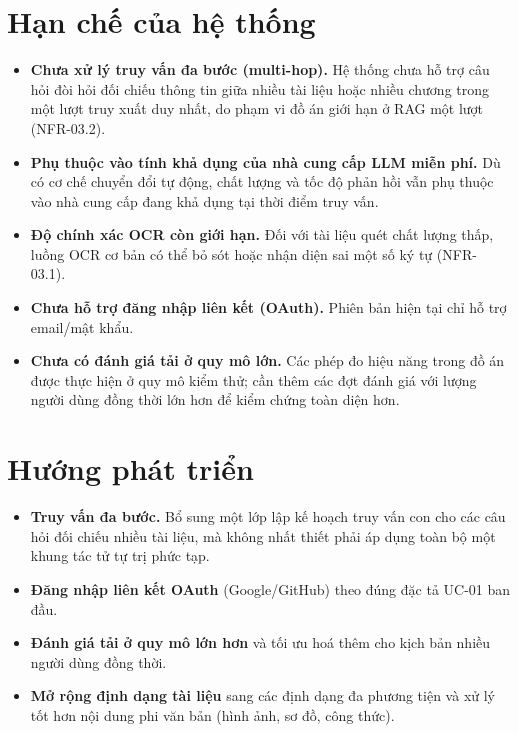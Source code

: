\section{Hạn chế của hệ thống}
\begin{itemize}
    \item \textbf{Chưa xử lý truy vấn đa bước (multi-hop).} Hệ thống chưa hỗ trợ câu hỏi đòi hỏi đối chiếu thông tin giữa nhiều tài liệu hoặc nhiều chương trong một lượt truy xuất duy nhất, do phạm vi đồ án giới hạn ở RAG một lượt (NFR-03.2).
    \item \textbf{Phụ thuộc vào tính khả dụng của nhà cung cấp LLM miễn phí.} Dù có cơ chế chuyển đổi tự động, chất lượng và tốc độ phản hồi vẫn phụ thuộc vào nhà cung cấp đang khả dụng tại thời điểm truy vấn.
    \item \textbf{Độ chính xác OCR còn giới hạn.} Đối với tài liệu quét chất lượng thấp, luồng OCR cơ bản có thể bỏ sót hoặc nhận diện sai một số ký tự (NFR-03.1).
    \item \textbf{Chưa hỗ trợ đăng nhập liên kết (OAuth).} Phiên bản hiện tại chỉ hỗ trợ email/mật khẩu.
    \item \textbf{Chưa có đánh giá tải ở quy mô lớn.} Các phép đo hiệu năng trong đồ án được thực hiện ở quy mô kiểm thử; cần thêm các đợt đánh giá với lượng người dùng đồng thời lớn hơn để kiểm chứng toàn diện hơn.
\end{itemize}

\section{Hướng phát triển}
\begin{itemize}
    \item \textbf{Truy vấn đa bước.} Bổ sung một lớp lập kế hoạch truy vấn con cho các câu hỏi đối chiếu nhiều tài liệu, mà không nhất thiết phải áp dụng toàn bộ một khung tác tử tự trị phức tạp.
    \item \textbf{Đăng nhập liên kết OAuth} (Google/GitHub) theo đúng đặc tả UC-01 ban đầu.
    \item \textbf{Đánh giá tải ở quy mô lớn hơn} và tối ưu hoá thêm cho kịch bản nhiều người dùng đồng thời.
    \item \textbf{Mở rộng định dạng tài liệu} sang các định dạng đa phương tiện và xử lý tốt hơn nội dung phi văn bản (hình ảnh, sơ đồ, công thức).
\end{itemize}
